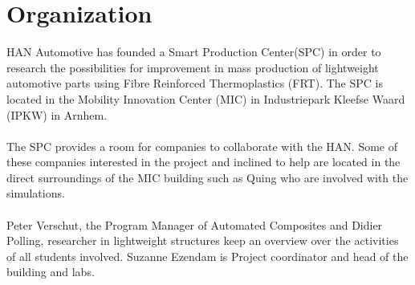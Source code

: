 
\chapter{Organization}

HAN Automotive has founded a Smart Production Center(SPC) in order to research the possibilities for improvement in mass production of lightweight automotive parts using Fibre Reinforced Thermoplastics (FRT). The SPC is located in the Mobility Innovation Center (MIC) in 
Industriepark Kleefse Waard (IPKW)
 in Arnhem. \\
 \\
 The SPC provides a room for companies to collaborate with the HAN.  Some of these companies interested in the project and inclined to help are located in the direct surroundings of the MIC building such as Quing who are involved with the simulations. \\
 \\
 Peter Verschut, the Program Manager of Automated Composites and Didier Polling, researcher in lightweight structures keep an overview over the activities of all students involved. Suzanne Ezendam is Project coordinator and head of the building and labs.